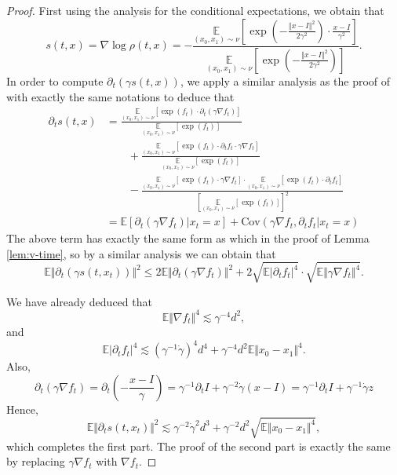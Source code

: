 \begin{proof}
    First using the analysis for the conditional expectations, we obtain that
$$s(t,x)=\nabla\log\rho(t,x)=-\frac{\underset{(x_0,x_1)\sim\nu}{\mathbb{E}}\left[\exp\left(-\frac{\Vert x-I\Vert^2}{2\gamma^2}\right)\cdot\frac{x-I}{\gamma^2}\right]}{\underset{(x_0,x_1)\sim\nu}{\mathbb{E}}\left[\exp\left(-\frac{\Vert x-I\Vert^2}{2\gamma^2}\right)\right]}.$$
    In order to compute $\partial_t(\gamma s(t,x))$, we apply a similar analysis as the proof of  with exactly the same notations to deduce that
    $$\begin{aligned}
        \partial_ts(t,x)&=\frac{\underset{(x_0,x_1)\sim\nu}{\mathbb{E}}\left[\exp(f_t)\cdot\partial_t(\gamma\nabla f_t)\right]}{\underset{(x_0,x_1)\sim\nu}{\mathbb{E}}\left[\exp(f_t)\right]}\\
        &\qquad+\frac{\underset{(x_0,x_1)\sim\nu}{\mathbb{E}}\left[\exp(f_t)\cdot\partial_tf_t\cdot\gamma\nabla f_t\right]}{\underset{(x_0,x_1)\sim\nu}{\mathbb{E}}\left[\exp(f_t)\right]}\\
        &\qquad-\frac{\underset{(x_0,x_1)\sim\nu}{\mathbb{E}}\left[\exp(f_t)\cdot\gamma\nabla f_t\right]\cdot\underset{(x_0,x_1)\sim\nu}{\mathbb{E}}\left[\exp(f_t)\cdot\partial_tf_t\right]}{\left[\underset{(x_0,x_1)\sim\nu}{\mathbb{E}}\left[\exp(f_t)\right]\right]^2}\\
        &=\mathbb{E}[\partial_t(\gamma\nabla f_t)|x_t=x]+\text{Cov}(\gamma\nabla f_t,\partial_tf_t|x_t=x)
    \end{aligned}$$
    The above term has exactly the same form as which in the proof of Lemma \ref{lem:v-time}, so by a similar analysis we can obtain that
    $$\mathbb{E}\Vert\partial_t(\gamma s(t,x_t))\Vert^2\le2\mathbb{E}\Vert\partial_t(\gamma\nabla f_t)\Vert^2+2\sqrt{\mathbb{E}|\partial_tf_t|^4}\cdot\sqrt{\mathbb{E}\Vert\gamma\nabla f_t\Vert^4}.$$

    We have already deduced that $$\mathbb{E}\Vert\nabla f_t\Vert^4\lesssim\gamma^{-4}d^2,$$
and $$\mathbb{E}|\partial_tf_t|^4\lesssim(\gamma^{-1}\dot{\gamma})^4d^4+\gamma^{-4}d^2\mathbb{E}\Vert x_0-x_1\Vert^4.$$
Also, $$\partial_t(\gamma\nabla f_t)=\partial_t\left(-\frac{x-I}{\gamma}\right)=\gamma^{-1}\partial_tI+\gamma^{-2}\dot{\gamma}(x-I)=\gamma^{-1}\partial_tI+\gamma^{-1}\dot{\gamma}z$$
Hence, $$\mathbb{E}\Vert\partial_ts(t,x_t)\Vert^2\lesssim\gamma^{-2}\dot{\gamma}^2d^3+\gamma^{-2}d^2\sqrt{\mathbb{E}\Vert x_0-x_1\Vert^4},$$
which completes the first part. The proof of the second part is exactly the same by replacing $\gamma\nabla f_t$ with $\nabla f_t$.
\end{proof}


